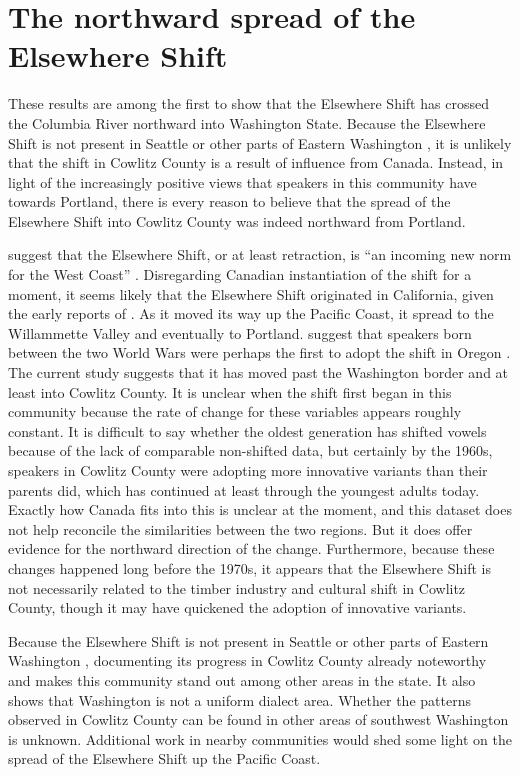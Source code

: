 \section{The northward spread of the Elsewhere Shift}

These results are among the first to show that the Elsewhere Shift has crossed the Columbia River northward into Washington State. Because the Elsewhere Shift is not present in Seattle or other parts of Eastern Washington \citep{wassink_2016_pads}, it is unlikely that the shift in Cowlitz County is a result of influence from Canada. Instead, in light of the increasingly positive views that speakers in this community have towards Portland, there is every reason to believe that the spread of the Elsewhere Shift into Cowlitz County was indeed northward from Portland.

\citeauthor{fridland_etal_2016_pads} suggest that the Elsewhere Shift, or at least \bat retraction, is ``an incoming new norm for the West Coast'' \citeyearpar[161]{fridland_etal_2016_pads}. Disregarding Canadian instantiation of the shift for a moment, it seems likely that the Elsewhere Shift originated in California, given the early reports of \citet{hinton_etal_1987}. As it moved its way up the Pacific Coast, it spread to the Willammette Valley and eventually to Portland. \citeauthor{mclarty_etal_2016} suggest that speakers born between the two World Wars were perhaps the first to adopt the shift in Oregon \citeyearpar[153]{mclarty_etal_2016}. The current study suggests that it has moved past the Washington border and at least into Cowlitz County. It is unclear when the shift first began in this community because the rate of change for these variables appears roughly constant. It is difficult to say whether the oldest generation has shifted vowels because of the lack of comparable non-shifted data, but certainly by the 1960s, speakers in Cowlitz County were adopting more innovative variants than their parents did, which has continued at least through the youngest adults today. Exactly how Canada fits into this is unclear at the moment, and this dataset does not help reconcile the similarities between the two regions. But it does offer evidence for the northward direction of the change. Furthermore, because these changes happened long before the 1970s, it appears that the Elsewhere Shift is not necessarily related to the timber industry and cultural shift in Cowlitz County, though it may have quickened the adoption of innovative variants.

Because the Elsewhere Shift is not present in Seattle or other parts of Eastern Washington \citep{wassink_2016_pads}, documenting its progress in Cowlitz County already noteworthy and makes this community stand out among other areas in the state. It also shows that Washington is not a uniform dialect area. Whether the patterns observed in Cowlitz County can be found in other areas of southwest Washington is unknown. Additional work in nearby communities would shed some light on the spread of the Elsewhere Shift up the Pacific Coast.


